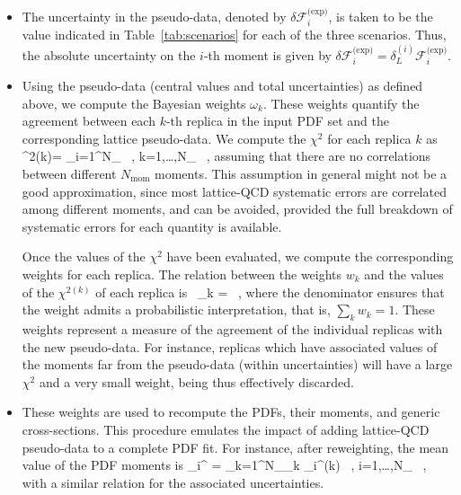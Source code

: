 \begin{itemize}
\item The uncertainty in the pseudo-data, denoted by 
$\delta\mathcal{F}_i^\text{(exp)} $, is taken to be the value indicated in
Table~\ref{tab:scenarios} for each of the three scenarios.
%
Thus, the absolute uncertainty on the $i$-th moment
is given by 
$\delta\mathcal{F}_i^\text{(exp)}=\delta_L^{(i)}\mathcal{F}_i^\text{(exp)} $.

\item Using the pseudo-data (central values and total uncertainties)
as defined above, we compute the Bayesian weights $\omega_k$.
%
These weights quantify the agreement between each $k$-th replica in 
the input PDF set and the corresponding lattice pseudo-data.
%
We compute the $\chi^2$ for each replica $k$ as
\be
\chi^{2(k)}= \sum_{i=1}^{N_}  \, , \quad k=1,\ldots,N_ \, ,
\ee
assuming that there are no correlations between different $N_\text{mom}$ moments.
%
This assumption in general might not be a good approximation, since most 
lattice-QCD systematic errors are correlated among different moments, 
and can be avoided, provided the full breakdown of systematic errors 
for each quantity is available.
  
Once the values of the $\chi^2$ have been evaluated,
we compute the corresponding weights for each replica.
%
The relation between the weights $w_k$  and the values of
the $\chi^{2(k)}$ of each replica is~\cite{Ball:2011gg,Ball:2010gb}
\be
\omega_k = \, ,
\ee
where the denominator ensures that the weight admits
a probabilistic interpretation, that is, $\sum_k w_k=1$.
%
These weights represent a measure of the agreement of the individual replicas 
with the new pseudo-data.
%
For instance, replicas which have associated values of the moments far from 
the pseudo-data (within uncertainties) will have a large $\chi^2$ and a 
very small weight, being thus effectively discarded.

\item These weights are used to recompute the PDFs, their moments,
and generic cross-sections.
%
This procedure emulates the
impact of adding lattice-QCD pseudo-data to a complete PDF fit.
%
For instance, after reweighting, the mean value of
the PDF moments is
\be
\label{eq:pseudodatadef1}
_i^ = \sum_{k=1}^{N_}\omega_k
_i^{(k)} \, , \quad i=1,\ldots,N_ \, ,
\ee
with a similar relation for the associated uncertainties.
\end{itemize}

